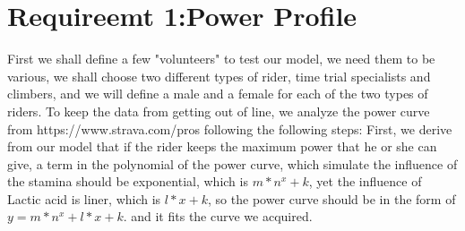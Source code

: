 \documentclass[12pt]{article}
\begin{document}
\section{Requireemt 1:Power Profile}
First we shall define a few "volunteers" to test our model, we need them to be various, we shall choose two different types of rider, time trial
specialists and climbers, and we will define a male and a female for each of the two types of riders. To keep the data from getting out of line, we analyze the power curve
from https://www.strava.com/pros following the following steps:
First, we derive from our model that if the rider keeps the maximum power that he or she can give, a term in the polynomial of the power curve,  which simulate the influence of the stamina should be exponential,
which is $m*n^x+k$, yet the influence of Lactic acid is liner, which is $l*x+k$, so the power curve should be in the form of $y=m*n^x+l*x+k$.
and it fits the curve we acquired.
\end{document}
